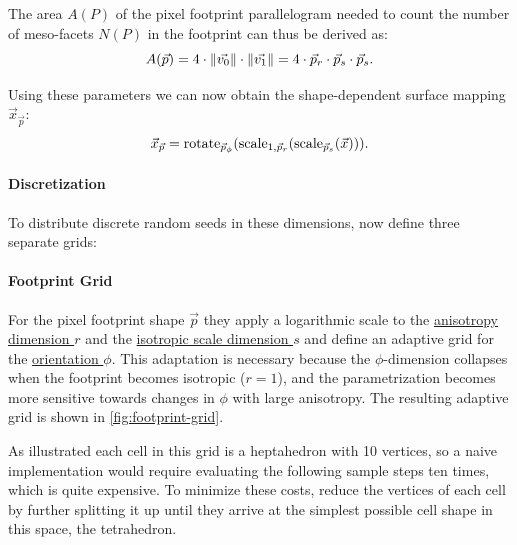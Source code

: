 


The area $A(P)$ of the pixel footprint parallelogram needed to count the number of meso-facets $N(P)$ in the footprint can thus be derived as:
%
\begin{equation}
\label{eq:area}
    A(\vec{p})
    = 4 \cdot \norm{\vec{v_0}} \cdot \norm{\vec{v_1}}
    = 4 \cdot \vec{p}_r \cdot \vec{p}_s \cdot \vec{p}_s.
\end{equation}

Using these parameters we can now obtain the shape-dependent surface mapping $\vec{x}_{\vec{p}}$:
%
\begin{equation}
\label{eq:anisotropy-compensation}
    \vec{x}_{\vec{p}}=\rotate{\vec{p}_{\phi}}{\scale{1,\vec{p}_r}{\scale{\vec{p}_s}{\vec{x}}}}.
\end{equation}

\paragraph{Discretization}
%
To distribute discrete random seeds in these dimensions, \textcite{deliot2023} now define three separate grids:


\paragraph{Footprint Grid}
\label{sec:footprint-grid}
%
For the pixel footprint shape $\vec{p}$ they apply a logarithmic scale to the \hyperref[dim:aniso]{anisotropy dimension $r$} and the \hyperref[dim:scale]{isotropic scale dimension $s$} and define an adaptive grid for the \hyperref[dim:phi]{orientation $\phi$}.
%
This adaptation is necessary because the $\phi$-dimension collapses when the footprint becomes isotropic ($r=1$), and the parametrization becomes more sensitive towards changes in $\phi$ with large anisotropy.
%
The resulting adaptive grid is shown in \cref{fig:footprint-grid}.



As illustrated each cell in this grid is a heptahedron with 10 vertices, so a naive implementation would require evaluating the following sample steps ten times, which is quite expensive.
%
To minimize these costs, \textcite{deliot2023} reduce the vertices of each cell by further splitting it up until they arrive at the simplest possible cell shape in this space, the tetrahedron.


